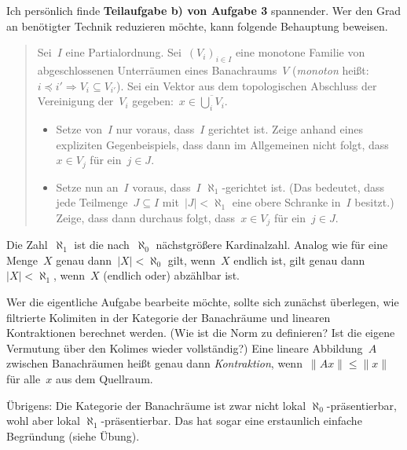 \documentclass{uebblatt}
\begin{document}
Ich persönlich finde \textbf{Teilaufgabe b) von Aufgabe 3} spannender.
Wer den Grad an benötigter Technik reduzieren möchte, kann folgende Behauptung
beweisen.
\begin{quote}
Sei~$I$ eine Partialordnung.
Sei~$(V_i)_{i \in I}$ eine monotone Familie von abgeschlossenen Unterräumen
eines Banachraums~$V$ (\emph{monoton} heißt: $i \preceq i' \Rightarrow
V_i \subseteq V_{i'}$).
Sei ein Vektor aus dem topologischen Abschluss der Vereinigung der~$V_i$
gegeben:~$x \in \overline{\bigcup_i V_i}$.
\begin{itemize}
\item Setze von~$I$ nur voraus, dass~$I$ gerichtet ist.
Zeige anhand eines expliziten Gegenbeispiels, dass dann im Allgemeinen nicht
folgt, dass~$x \in V_j$ für ein~$j \in J$.
\item Setze nun an~$I$ voraus, dass~$I$ $\aleph_1$-gerichtet ist. (Das
bedeutet, dass jede Teilmenge~$J \subseteq I$ mit~$|J| < \aleph_1$ eine obere
Schranke in~$I$ besitzt.) Zeige, dass dann durchaus folgt, dass~$x \in V_j$ für
ein~$j \in J$.
\end{itemize}
\end{quote}
Die Zahl~$\aleph_1$ ist die nach~$\aleph_0$ nächstgrößere Kardinalzahl. Analog
wie für eine Menge~$X$ genau dann~$|X| < \aleph_0$ gilt, wenn~$X$ endlich ist,
gilt genau dann~$|X| < \aleph_1$, wenn~$X$ (endlich oder) abzählbar ist.

Wer die eigentliche Aufgabe bearbeite möchte, sollte sich zunächst überlegen,
wie filtrierte Kolimiten in der Kategorie der Banachräume und linearen
Kontraktionen berechnet werden. (Wie ist die Norm zu definieren? Ist die eigene
Vermutung über den Kolimes wieder vollständig?) Eine lineare Abbildung~$A$ zwischen
Banachräumen heißt genau dann \emph{Kontraktion}, wenn~$\|Ax\| \leq \|x\|$ für
alle~$x$ aus dem Quellraum.

Übrigens: Die Kategorie der Banachräume ist zwar nicht lokal
$\aleph_0$-präsentierbar, wohl aber lokal $\aleph_1$-präsentierbar. Das hat
sogar eine erstaunlich einfache Begründung (siehe Übung).
\end{document}
